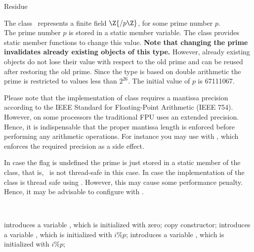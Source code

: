 \begin{ccRefClass} {Residue}
\label{Residue}

\def\ccTagOperatorLayout{\ccTrue}

\ccDefinition

The class \ccRefName\ represents a finite field $\Z{/p\Z}$, 
for some prime number $p$. \\

The prime number $p$ is stored in a static member variable. 
The class provides static member functions to change this value. 
{\bf Note that changing the prime invalidates already existing objects 
of this type.}
However, already existing objects do not lose their value with respect to the 
old prime and can be reused after restoring the old prime. 
Since the type is based on double 
arithmetic the prime is restricted to values less than $2^{26}$. 
The initial value of $p$ is 67111067. 

Please note that the implementation of class  requires a mantissa 
precision according to the IEEE Standard for Floating-Point Arithmetic (IEEE 754). 
However, on some processors the traditional FPU uses an extended precision. Hence, it 
is  indispensable that the proper mantissa length is enforced before performing 
any arithmetic operations. For instance you may use  with 
, which enforces the required precision as a side effect. 

In case the flag  
is undefined the prime is just stored in a static member 
of the class, that is, \ccRefName\ is not thread-safe in this case.  
In case 
the implementation of the class is thread safe using 
. However, this may cause some performance 
penalty. Hence, it may be advisable to configure  with 
. 


\ccIsModel
{}\\


\ccCreation
{}

{introduces a variable \ccVar, which is initialized with zero;}
\ccGlue
{}
{copy constructor;}
\ccGlue
{}
{introduces a variable \ccVar, which is initialized with $i \%  p$;}
\ccGlue
{}
{introduces a variable \ccVar, which is initialized with $i \%  p$;}


\end{ccRefClass}
